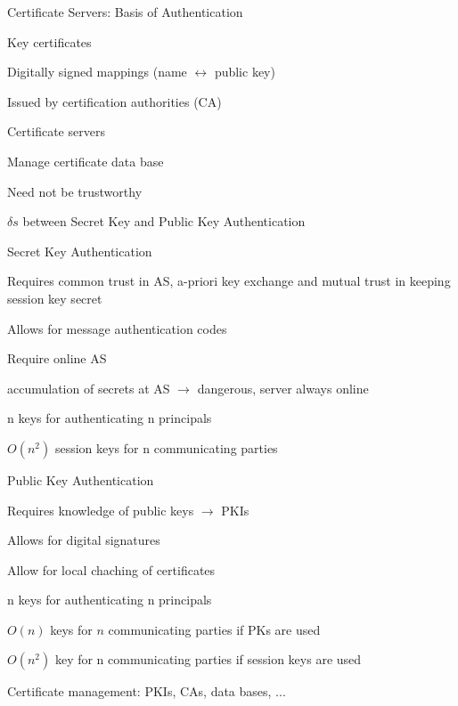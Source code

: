 \documentclass[a4paper]{article}
\begin{document}
\begin{multicols}{3}
    Certificate Servers: Basis of Authentication
    \begin{itemize*}
        \item Key certificates
        \begin{itemize*}
            \item Digitally signed mappings (name $\leftrightarrow$ public key)
            \item Issued by certification authorities (CA)
        \end{itemize*}
        \item Certificate servers
        \begin{itemize*}
            \item Manage certificate data base
            \item Need not be trustworthy
        \end{itemize*}
    \end{itemize*}

    $\delta s$ between Secret Key and Public Key Authentication
    \begin{itemize*}
        \item Secret Key Authentication
        \begin{itemize*}
            \item Requires common trust in AS, a-priori key exchange and mutual trust in keeping session key secret
            \item Allows for message authentication codes
            \item Require online AS
            \item accumulation of secrets at AS $\rightarrow$ dangerous, server always online
            \item n keys for authenticating n principals
            \item $O(n^2)$ session keys for n communicating parties
        \end{itemize*}
        \item Public Key Authentication
        \begin{itemize*}
            \item Requires knowledge of public keys $\rightarrow$ PKIs
            \item Allows for digital signatures
            \item Allow for local chaching of certificates
            \item n keys for authenticating n principals
            \item $O(n)$ keys for $n$ communicating parties if PKs are used
            \item $O(n^2)$ key for n communicating parties if session keys are used
            \item Certificate management: PKIs, CAs, data bases, ...
        \end{itemize*}
    \end{itemize*}


\end{multicols}
\end{document}
